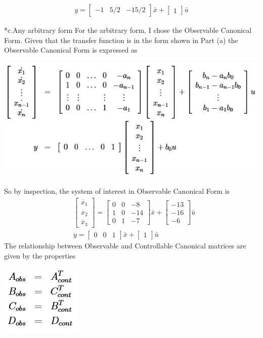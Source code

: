 \documentclass[paper=a4, fontsize=11pt]{scrartcl} %
\numberwithin{equation}{section} %
\numberwithin{figure}{section} %
\numberwithin{table}{section} %
\begin{document}
\begin{section}
\begin{subsection}
\begin{align*}
y=\begin{bmatrix}
-1 & 5/2 & -15/2 \end{bmatrix}\bar{x} + \begin{bmatrix}1\end{bmatrix}\bar{u}
\end{align*}
\end{subsection}
\begin{subsection}*{c.Any arbitrary form}
For the arbitrary form, I chose the Observable Canonical Form.  Given that the transfer function is in the form shown in Part (a) the Observable Canonical Form is expressed as
\begin{center}
\includegraphics{Image6}
\end{center}
So by inspection, the system of interest in Observable Canonical Form is
\begin{align*}
&\begin{bmatrix}\dot{x_1}\\\dot{x_2}\\\dot{x_3}\end{bmatrix}=\begin{bmatrix}0 & 0 & -8\\1 & 0 & -14\\0 & 1 & -7\end{bmatrix}\bar{x}+\begin{bmatrix}-13\\-16\\-6\end{bmatrix}\bar{u}\\
& y=\begin{bmatrix}
0 & 0 & 1 \end{bmatrix}\bar{x} + \begin{bmatrix}1\end{bmatrix}\bar{u}
\end{align*}
The relationship between Observable and Controllable Canonical matrices are given by the properties
\begin{center}
\includegraphics{Image7}
\end{center} 
\end{subsection}
\end{section}
\end{document}

